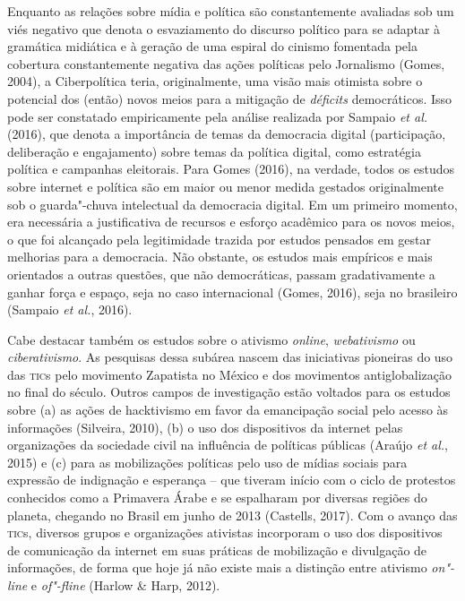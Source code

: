Enquanto as relações sobre mídia e política são constantemente avaliadas
sob um viés negativo que denota o esvaziamento do discurso político para
se adaptar à gramática midiática e à geração de uma espiral do cinismo
fomentada pela cobertura constantemente negativa das ações políticas
pelo Jornalismo (Gomes, 2004), a Ciberpolítica teria, originalmente, uma
visão mais otimista sobre o potencial dos (então) novos meios para a
mitigação de \emph{déficits} democráticos. Isso pode ser constatado
empiricamente pela análise realizada por Sampaio \emph{et al.} (2016),
que denota a importância de temas da democracia digital (participação,
deliberação e engajamento) sobre temas da política digital, como
estratégia política e campanhas eleitorais. Para Gomes (2016), na
verdade, todos os estudos sobre internet e política são em maior ou
menor medida gestados originalmente sob o guarda"-chuva intelectual da
democracia digital. Em um primeiro momento, era necessária a
justificativa de recursos e esforço acadêmico para os novos meios, o que
foi alcançado pela legitimidade trazida por estudos pensados em gestar
melhorias para a democracia. Não obstante, os estudos mais empíricos e
mais orientados a outras questões, que não democráticas, passam
gradativamente a ganhar força e espaço, seja no caso internacional
(Gomes, 2016), seja no brasileiro (Sampaio \emph{et al.}, 2016).

Cabe destacar também os estudos sobre o ativismo \emph{online},
\emph{webativismo} ou \emph{ciberativismo}. As pesquisas dessa subárea
nascem das iniciativas pioneiras do uso das \textsc{tic}s pelo movimento
Zapatista no México e dos movimentos antiglobalização no final do
século. Outros campos de investigação estão voltados para os estudos
sobre (a) as ações de hacktivismo em favor da emancipação social pelo
acesso às informações (Silveira, 2010), (b) o uso dos dispositivos da
internet pelas organizações da sociedade civil na influência de
políticas públicas (Araújo \emph{et al.}, 2015) e (c) para as
mobilizações políticas pelo uso de mídias sociais para expressão de
indignação e esperança -- que tiveram início com o ciclo de protestos
conhecidos como a Primavera Árabe e se espalharam por diversas regiões
do planeta, chegando no Brasil em junho de 2013 (Castells, 2017). Com o
avanço das \textsc{tic}s, diversos grupos e organizações ativistas incorporam o
uso dos dispositivos de comunicação da internet em suas práticas de
mobilização e divulgação de informações, de forma que hoje já não existe
mais a distinção entre ativismo \emph{on"-line} e \emph{of"-fline} (Harlow
\& Harp, 2012).

